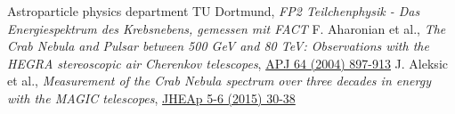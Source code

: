 \begin{thebibliography}{99}
  Astroparticle physics department TU Dortmund, \textit{FP2 Teilchenphysik - Das Energiespektrum des Krebsnebens, gemessen mit FACT}
  F. Aharonian et al., \textit{The Crab Nebula and Pulsar between 500 GeV and 80 TeV: Observations with the HEGRA stereoscopic air Cherenkov telescopes}, \href{https://arxiv.org/abs/astro-ph/0407118}{APJ 64 (2004) 897-913}
  J. Aleksic et al., \textit{Measurement of the Crab Nebula spectrum over three decades in energy with the MAGIC telescopes}, \href{https://arxiv.org/abs/1406.6892}{JHEAp 5-6 (2015) 30-38}
\end{thebibliography}
